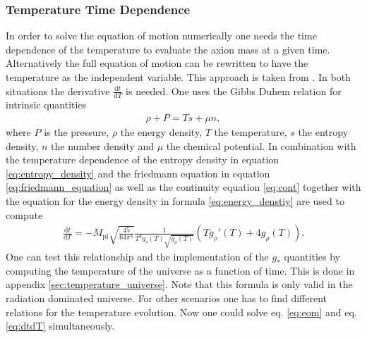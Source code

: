 \documentclass[twoside,a4paper, 12pt]{article}
\newcommand{\diff}{\mathrm{d}}
\numberwithin{equation}{section}
\begin{document}
\subsubsection{Temperature Time Dependence}
In order to solve the equation of motion numerically
one needs the time dependence of the temperature
to evaluate the axion mass at a given time.
Alternatively the full equation of motion can be rewritten
to have the temperature as the independent variable.
This approach is taken from \cite[S11]{LatticQCD4Cosmo}.
In both situations the derivative $\frac{\diff t}{\diff T}$
is needed.
One uses the Gibbs Duhem relation for intrinsic quantities
\begin{align}
    \label{eq:gibbs_duhem}
    \rho + P = T s + \mu n,
\end{align}
where $P$ is the pressure, $\rho$ the energy density, $T$ the temperature, $s$ the entropy density,
$n$ the number density and $\mu$ the chemical potential.
In combination with the temperature dependence of the entropy density in equation
\eqref{eq:entropy_density}
and the friedmann equation
in equation \eqref{eq:friedmann_equation} as well as the continuity equation \eqref{eq:cont}
together with the equation for
the energy density in formula \eqref{eq:energy_denstiy} are used to compute
\begin{align}
    \label{eq:dtdT}
    \frac{\diff t}{\diff T} = - M_\mathrm{pl} \sqrt{\frac{45}{64 \pi^3}} \frac{1}{T^3 g_s(T) \sqrt{g_\rho(T)}} (T g_\rho'(T) + 4 g_\rho(T)).
\end{align}
One can test this relationship and the implementation of the $g_*$ quantities by computing the temperature
of the universe as a function of time. This is done in appendix \ref{sec:temperature_universe}.
Note that this formula is only valid in the radiation dominated universe.
For other scenarios one has to find different relations for the temperature evolution.
Now one could solve eq. \eqref{eq:eom} and eq. \eqref{eq:dtdT} simultaneously.
\end{document}
